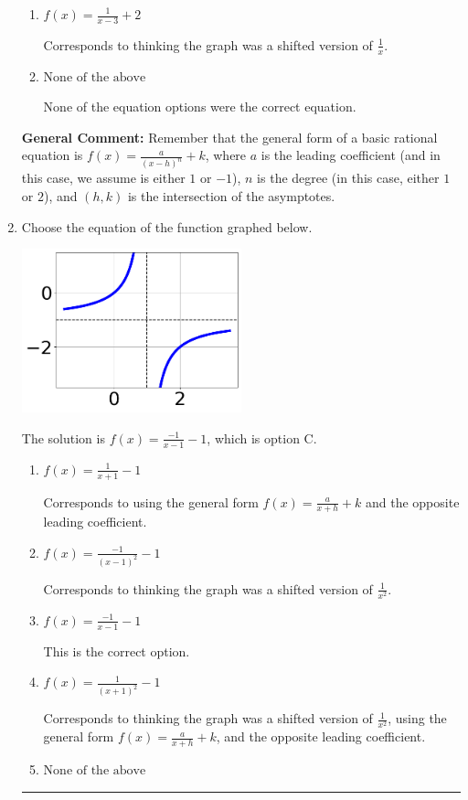 \documentclass{extbook}[14pt]
\newcommand{\litem}[1]{\item #1

\rule{\textwidth}{0.4pt}}
\begin{document}
\begin{enumerate}
{\begin{enumerate}[label=\Alph*.]
The $x$-value of the equation does not match the graph.
\item \( f(x) = \frac{1}{x - 3} + 2 \)

Corresponds to thinking the graph was a shifted version of $\frac{1}{x}$.
\item \( \text{None of the above} \)

None of the equation options were the correct equation.
\end{enumerate}

\textbf{General Comment:} Remember that the general form of a basic rational equation is $ f(x) = \frac{a}{(x-h)^n} + k$, where $a$ is the leading coefficient (and in this case, we assume is either $1$ or $-1$), $n$ is the degree (in this case, either $1$ or $2$), and $(h, k)$ is the intersection of the asymptotes.
}
\litem{
Choose the equation of the function graphed below.

\begin{center}
    \includegraphics[width=0.5\textwidth]{../Figures/rationalGraphToEquationCopyA.png}
\end{center}


The solution is \( f(x) = \frac{-1}{x - 1} - 1 \), which is option C.\begin{enumerate}[label=\Alph*.]
\item \( f(x) = \frac{1}{x + 1} - 1 \)

Corresponds to using the general form $f(x) = \frac{a}{x+h}+k$ and the opposite leading coefficient.
\item \( f(x) = \frac{-1}{(x - 1)^2} - 1 \)

Corresponds to thinking the graph was a shifted version of $\frac{1}{x^2}$.
\item \( f(x) = \frac{-1}{x - 1} - 1 \)

This is the correct option.
\item \( f(x) = \frac{1}{(x + 1)^2} - 1 \)

Corresponds to thinking the graph was a shifted version of $\frac{1}{x^2}$, using the general form $f(x) = \frac{a}{x+h}+k$, and the opposite leading coefficient.
\item \( \text{None of the above} \)


\end{enumerate}}
\end{enumerate}
\end{document}
